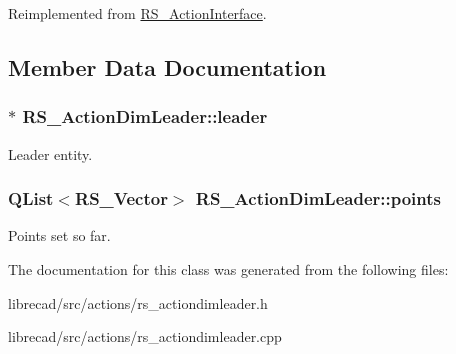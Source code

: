 Reimplemented from \hyperlink{classRS__ActionInterface_af1a8d898a8bf0521295d7c45d80e6d09}{R\-S\-\_\-\-Action\-Interface}.



\subsection{Member Data Documentation}
\hypertarget{classRS__ActionDimLeader_aa6d5975fd2e44dc02148d68f13c5feb3}{
\subsubsection[{leader}]{$\ast$ R\-S\-\_\-\-Action\-Dim\-Leader\-::leader\hspace{0.3cm}{\ttfamily [protected]}}}\label{classRS__ActionDimLeader_aa6d5975fd2e44dc02148d68f13c5feb3}
Leader entity. \hypertarget{classRS__ActionDimLeader_a11d1b9926c1a86a1f3939a60fccc66b7}{
\subsubsection[{points}]{\setlength{\rightskip}{0pt plus 5cm}Q\-List$<${\bf R\-S\-\_\-\-Vector}$>$ R\-S\-\_\-\-Action\-Dim\-Leader\-::points\hspace{0.3cm}{\ttfamily [protected]}}}\label{classRS__ActionDimLeader_a11d1b9926c1a86a1f3939a60fccc66b7}
Points set so far. 

The documentation for this class was generated from the following files\-:\begin{DoxyCompactItemize}
\item 
librecad/src/actions/rs\-\_\-actiondimleader.\-h\item 
librecad/src/actions/rs\-\_\-actiondimleader.\-cpp\end{DoxyCompactItemize}
